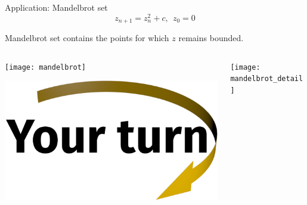 \documentclass[svgnames]{beamer}
\begin{document}
\begin{frame}{Application: Mandelbrot set}
 \begin{displaymath}
  z_{n+1} = z_n^2+c,\ \ z_0=0
 \end{displaymath}

 Mandelbrot set contains the points for which $z$ remains bounded.

 \begin{columns}
  \begin{column}{0.5\textwidth}
   \begin{center}
    \texttt{[image: mandelbrot]}

    \vspace{0.3truecm}
    \includegraphics[width=3truecm]{yourturn}
   \end{center}
  \end{column}%
  \begin{column}{0.5\textwidth}
   \begin{center}
    \texttt{[image: mandelbrot\_detail]}

    \vspace{2.35truecm}
   \end{center}
  \end{column}
 \end{columns}
\end{frame}
\end{document}
